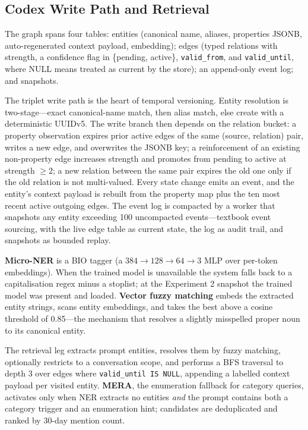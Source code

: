 \documentclass[11pt,a4paper]{article}
\begin{document}
\subsection{Codex Write Path and Retrieval}
\label{app:codex}

The graph spans four tables: entities (canonical name, aliases, properties JSONB, auto-regenerated context payload, embedding); edges (typed relations with strength, a confidence flag in \{pending, active\}, \texttt{valid\_from}, and \texttt{valid\_until}, where NULL means treated as current by the store); an append-only event log; and snapshots.

The triplet write path is the heart of temporal versioning. Entity resolution is two-stage---exact canonical-name match, then alias match, else create with a deterministic UUIDv5. The write branch then depends on the relation bucket: a property observation expires prior active edges of the same (source, relation) pair, writes a new edge, and overwrites the JSONB key; a reinforcement of an existing non-property edge increases strength and promotes from pending to active at strength $\geq 2$; a new relation between the same pair expires the old one only if the old relation is not multi-valued. Every state change emits an event, and the entity's context payload is rebuilt from the property map plus the ten most recent active outgoing edges. The event log is compacted by a worker that snapshots any entity exceeding 100 uncompacted events---textbook event sourcing, with the live edge table as current state, the log as audit trail, and snapshots as bounded replay.

\textbf{Micro-NER} is a BIO tagger (a $384 \rightarrow 128 \rightarrow 64 \rightarrow 3$ MLP over per-token embeddings). When the trained model is unavailable the system falls back to a capitalisation regex minus a stoplist; at the Experiment 2 snapshot the trained model was present and loaded. \textbf{Vector fuzzy matching} embeds the extracted entity strings, scans entity embeddings, and takes the best above a cosine threshold of 0.85---the mechanism that resolves a slightly misspelled proper noun to its canonical entity.

The retrieval leg extracts prompt entities, resolves them by fuzzy matching, optionally restricts to a conversation scope, and performs a BFS traversal to depth 3 over edges where \texttt{valid\_until IS NULL}, appending a labelled context payload per visited entity. \textbf{MERA}, the enumeration fallback for category queries, activates only when NER extracts no entities \emph{and} the prompt contains both a category trigger and an enumeration hint; candidates are deduplicated and ranked by 30-day mention count.
\end{document}
